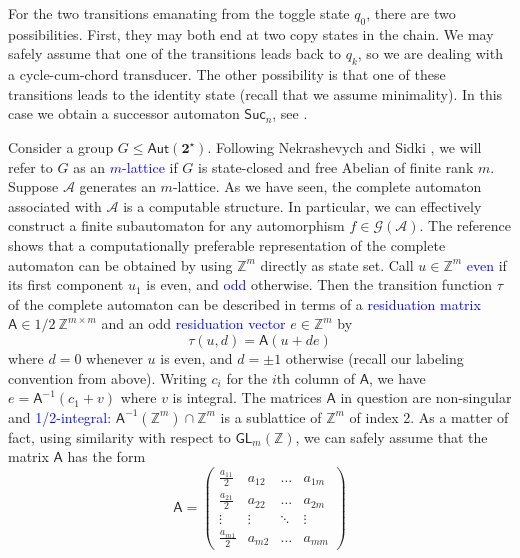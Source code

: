 \documentclass[12pt]{svmult}
\def\emph#1{\textcolor{blue}{#1}}
\def\2{\mathbf{2}}
\def\Aut{\mathsf{Aut}}
\def\SS{\Star{\2}}
\def\SUC#1{\mathsf{Suc}_{#1}}
\def\cA{\mathcal{A}}
\def\grp{\mathcal{G}}           %
\def\Z{\mathbb{Z}}
\def\AA{\mathsf{A}}             %
\def\Ai{\mathsf{A}^{-1}}        %
\def\GL#1{\mathsf{GL}_{#1}(\Z)}
\providecommand{\Star}[1]{{#1}^{\star}}
\begin{document}
For the two transitions emanating from the toggle state $q_0$, there are two possibilities. 
First, they may both end at two copy states in the chain. 
We may safely assume that one of the transitions leads back to $q_{k}$, 
so we are dealing with a cycle-cum-chord transducer. 
The other possibility is that one of these transitions leads to the identity state
(recall that we assume minimality).  
In this case we obtain a successor automaton $\SUC{n}$, see
\cite{Nekrashevych05:self_similar_groups}.




Consider a group $G \leq \Aut(\SS)$. 
Following Nekrashevych and Sidki \cite{NekrashevychSidki04:automorphisms}, we will refer 
to $G$  as an \emph{$m$-lattice} if $G$ is state-closed and free Abelian of finite rank $m$. 
Suppose $\cA$ generates an $m$-lattice. 
As we have seen, the complete automaton associated with $\cA$ is a computable 
structure. 
In particular, we can effectively construct a finite subautomaton for any 
automorphism $f \in \grp(\cA)$. 
The reference shows that a computationally preferable representation of the complete automaton 
can be obtained by using $\Z^m$ directly as state set.
Call $u \in \Z^{m}$ \emph{even} if its first component $u_1$  is even, and \emph{odd} otherwise. 
Then the transition function $\tau$ of the complete automaton can be described in terms 
of a \emph{residuation matrix} $\AA \in 1/2 \: \Z^{m \times m}$ and an odd \emph{residuation vector} 
$e \in \Z^{m}$ by
%
\begin{equation} 
\tau(u,d) = \AA (u + d e)   \label{eq:3}
\end{equation}
%
where $d = 0$ whenever $u$  is even, and $d = \pm1$ otherwise 
(recall our labeling convention from above). 
Writing $c_{i}$ for the $i$th column of $\AA$, we have $e = \Ai( c_{1} + v )$ 
where $v$ is integral. 
The matrices $\AA$ in question are non-singular and \emph{1/2-integral}:  
$\AA^{-1}(\Z^{m}) \cap \Z^{m}$ is a sublattice of $\Z^m$ of index 2.
As a matter of fact, using similarity with respect to $\GL{m}$, 
we can safely assume that the matrix $\AA$ has the form 
%
\begin{equation}
  \label{eq:4}
  \AA = 
  \begin{pmatrix}
    \frac{a_{11}}{2} &  a_{12} &   \ldots & a_{1m} \\
    \frac{a_{21}}{2} &  a_{22} &   \ldots & a_{2m} \\
    \vdots  &  \vdots&   \ddots & \vdots \\ 
    \frac{a_{m1}}{2} &  a_{m2} &   \ldots & a_{mm} 
   \end{pmatrix}
\end{equation}
\end{document}

